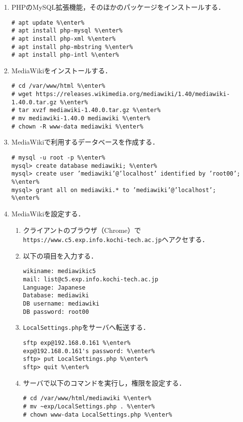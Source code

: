 \documentclass{jlreq}
\begin{document}
\begin{enumerate}
    \item PHPのMySQL拡張機能，そのほかのパッケージをインストールする．
          \begin{lstlisting}
# apt update %\enter%        
# apt install php-mysql %\enter%
# apt install php-xml %\enter%
# apt install php-mbstring %\enter%
# apt install php-intl %\enter%
    \end{lstlisting}
    \item MediaWikiをインストールする．
          \begin{lstlisting}
# cd /var/www/html %\enter%
# wget https://releases.wikimedia.org/mediawiki/1.40/mediawiki-1.40.0.tar.gz %\enter%
# tar xvzf mediawiki-1.40.0.tar.gz %\enter%
# mv mediawiki-1.40.0 mediawiki %\enter%
# chown -R www-data mediawiki %\enter%
\end{lstlisting}
    \item MediaWikiで利用するデータベースを作成する．
          \begin{lstlisting}
# mysql -u root -p %\enter%
mysql> create database mediawiki; %\enter%
mysql> create user ’mediawiki’@’localhost’ identified by ’root00’; %\enter%
mysql> grant all on mediawiki.* to ’mediawiki’@’localhost’; %\enter%
\end{lstlisting}
    \item MediaWikiを設定する．
          \begin{enumerate}
              \item クライアントのブラウザ（Chrome）で\texttt{https://www.c5.exp.info.kochi-tech.ac.jp}ヘアクセする．
              \item 以下の項目を入力する．
                    \begin{lstlisting}
wikiname: mediawikic5
mail: list@c5.exp.info.kochi-tech.ac.jp
Language: Japanese
Database: mediawiki
DB username: mediawiki
DB password: root00
                \end{lstlisting}
              \item \texttt{LocalSettings.php}をサーバへ転送する．
                    \begin{lstlisting}[caption={Windows のクライアントて実行}]
sftp exp@192.168.0.161 %\enter%
exp@192.168.0.161's password: %\enter%
sftp> put LocalSettings.php %\enter%
sftp> quit %\enter%
\end{lstlisting}
              \item サーバで以下のコマンドを実行し，権限を設定する．
                    \begin{lstlisting}
# cd /var/www/html/mediawiki %\enter%
# mv ~exp/LocalSettings.php . %\enter%
# chown www-data LocalSettings.php %\enter%
\end{lstlisting}
          \end{enumerate}
\end{enumerate}
\end{document}
